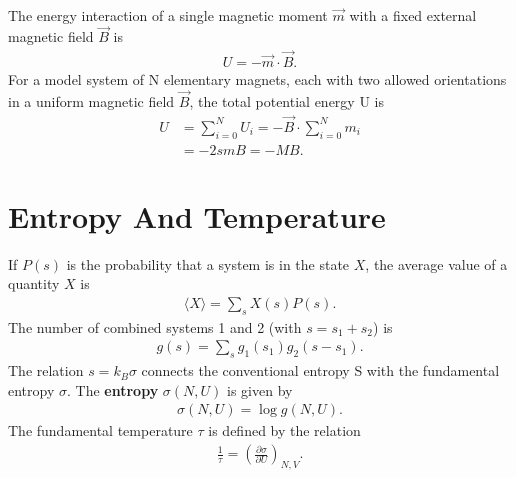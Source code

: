 \begin{multicols}{2}
\begin{align}
	\end{align}
	The energy interaction of a single magnetic moment $\vec{m}$ with a fixed external magnetic field $\vec{B}$ is
	\begin{align}
		U=-\vec{m}\cdot \vec{B}.
	\end{align}
	For a model system of N elementary magnets, each with two allowed orientations in a uniform magnetic field $\vec{B}$, the total potential energy U is
	\begin{align}
		U &=\sum_{i=0}^{N}U_i=-\vec{B}\cdot \sum_{i=0}^{N}m_i \\
		&=-2smB = -MB.
	\end{align}
	\section{Entropy And Temperature}
	If $P(s)$ is the probability that a system is in the state $X$, the average value of a quantity $X$ is 
	\begin{align}
		\langle X \rangle = \sum_{s}X(s)P(s).
	\end{align}
	The number of combined systems 1 and 2 (with $s=s_1+s_2$) is
	\begin{align}
		g(s) = \sum_s g_1(s_1)g_2(s-s_1).
	\end{align}
	The relation $s=k_B\sigma$ connects the conventional entropy S with the fundamental entropy $\sigma$. The \textbf{entropy} $\sigma(N,U)$ is given by 
	\begin{align}
		\sigma(N,U) = \log g(N,U).
	\end{align}
	The fundamental temperature $\tau$ is defined by the relation
	\begin{align}
		\frac{1}{\tau} = \left(\frac{\partial \sigma}{\partial U}\right)_{N,V}.
	\end{align}

\end{multicols}
